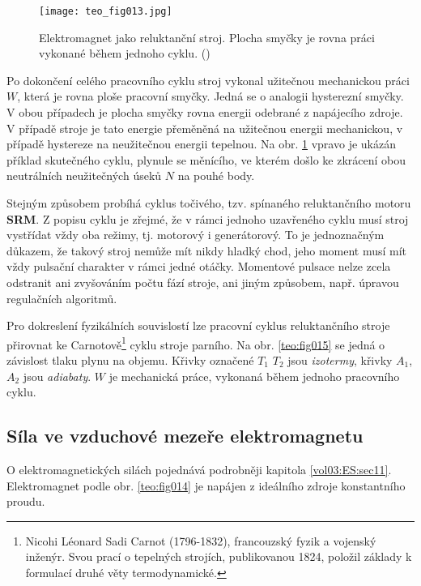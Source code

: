       \begin{figure}[ht!] %
        \centering
        \texttt{[image: teo\_fig013.jpg]}
        \caption{Elektromagnet jako reluktanční stroj. Plocha smyčky je rovna práci vykonané během
                 jednoho cyklu.
                 (\cite[s.~164]{Patocka4})}
        \label{teo:fig013}
      \end{figure}

      Po dokončení celého pracovního cyklu stroj vykonal užitečnou mechanickou práci \(W\), která 
      je rovna ploše pracovní smyčky. Jedná se o analogii hysterezní smyčky. V obou případech je 
      plocha smyčky rovna energii odebrané z napájecího zdroje. V případě stroje je tato energie 
      přeměněná na užitečnou energii mechanickou, v případě hystereze na neužitečnou energii 
      tepelnou. Na obr. \ref{teo:fig013} vpravo je ukázán příklad skutečného cyklu, plynule se 
      měnícího, ve kterém došlo ke zkrácení obou neutrálních neužitečných úseků \(N\) na pouhé body.


      Stejným způsobem probíhá cyklus točivého, tzv. spínaného reluktančního motoru \textbf{SRM}. Z 
      popisu cyklu je zřejmé, že v rámci jednoho uzavřeného cyklu musí stroj vystřídat vždy oba 
      režimy, tj. motorový i generátorový. To je jednoznačným důkazem, že takový stroj nemůže mít 
      nikdy hladký chod, jeho moment musí mít vždy pulsační charakter v rámci jedné otáčky. 
      Momentové pulsace nelze zcela odstranit ani zvyšováním počtu fází stroje, ani jiným způsobem, 
      např. úpravou regulačních algoritmů.

      Pro dokreslení fyzikálních souvislostí lze pracovní cyklus reluktančního stroje přirovnat ke 
      Carnotově\footnote{Nicohi Léonard Sadi Carnot (1796-1832), francouzský fyzik a vojenský 
      inženýr. Svou prací o tepelných strojích, publikovanou 1824, položil základy k formulací 
      druhé věty termodynamické.} cyklu stroje parního. Na obr. \ref{teo:fig015} se jedná o 
      závislost tlaku plynu na objemu. Křivky označené \(T_1\) \(T_2\) jsou \emph{izotermy}, křivky 
      \(A_1\), \(A_2\) jsou \emph{adiabaty}. \(W\) je mechanická práce, vykonaná během jednoho 
      pracovního cyklu.

      
    \subsection{Síla ve vzduchové mezeře elektromagnetu}
       O elektromagnetických silách pojednává podrobněji kapitola \ref{vol03:ES:sec11}.
       Elektromagnet podle obr. \ref{teo:fig014} je napájen z ideálního zdroje konstantního proudu.
       
